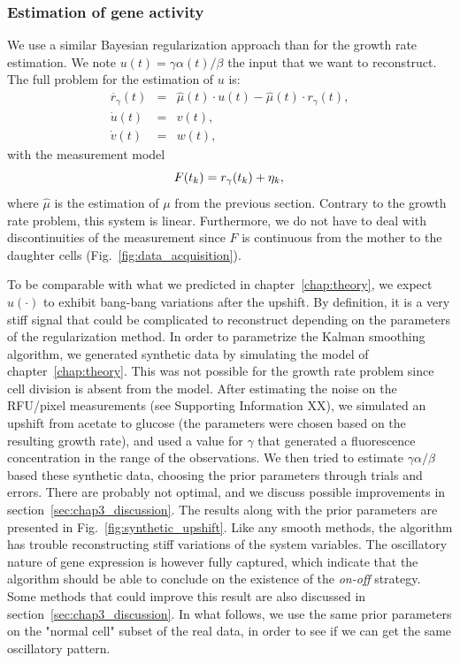 \subsubsection*{Estimation of gene activity}

We use a similar Bayesian regularization approach than for the growth rate estimation.
We note $u(t) = \gamma \alpha (t) / \beta$ the input that we want to reconstruct.
The full problem for the estimation of $u$ is:
\begin{eqnarray}
\dot{r_\gamma}(t) &=& \hat{\mu} (t) \cdot u (t) - \hat{\mu} (t) \cdot r_\gamma (t), \nonumber\\
\dot{u}(t) &=& v(t),\label{eq:full_u_prob}\\
\dot{v}(t) &=& w(t),\nonumber
\end{eqnarray}
with the measurement model
\begin{equation*}
F(t_k) = r_\gamma (t_k) + \eta_k,\\
\end{equation*}
where $\hat{\mu}$ is the estimation of $\mu$ from the previous section.
Contrary to the growth rate problem, this system is linear.
Furthermore, we do not have to deal with discontinuities of the measurement since $F$ is continuous from the mother to the daughter cells (Fig.~\ref{fig:data_acquisition}).

To be comparable with what we predicted in chapter~\ref{chap:theory}, we expect $u(\cdot)$ to exhibit bang-bang variations after the upshift.
By definition, it is a very stiff signal that could be complicated to reconstruct depending on the parameters of the regularization method.
In order to parametrize the Kalman smoothing algorithm, we generated synthetic data by simulating the model of chapter~\ref{chap:theory}.
This was not possible for the growth rate problem since cell division is absent from the model.
After estimating the noise on the RFU/pixel measurements (see Supporting Information XX), we simulated an upshift from acetate to glucose (the parameters were chosen based on the resulting growth rate), and used a value for $\gamma$ that generated a fluorescence concentration in the range of the observations.
We then tried to estimate $\gamma \alpha / \beta$ based these synthetic data, choosing the prior parameters through trials and errors.
There are probably not optimal, and we discuss possible improvements in section~\ref{sec:chap3_discussion}.
The results along with the prior parameters are presented in Fig.~\ref{fig:synthetic_upshift}.
Like any smooth methods, the algorithm has trouble reconstructing stiff variations of the system variables.
The oscillatory nature of gene expression is however fully captured, which indicate that the algorithm should be able to conclude on the existence of the \textit{on-off} strategy.
Some methods that could improve this result are also discussed in section~\ref{sec:chap3_discussion}.
In what follows, we use the same prior parameters on the "normal cell" subset of the real data, in order to see if we can get the same oscillatory pattern.

